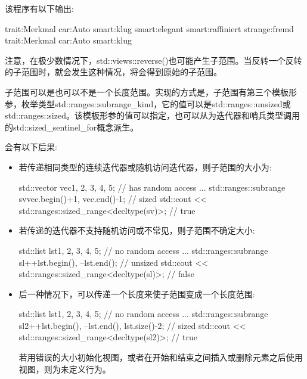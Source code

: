 该程序有以下输出:

\begin{shell}
trait:Merkmal car:Auto smart:klug smart:elegant smart:raffiniert strange:fremd
trait:Merkmal car:Auto smart:klug
\end{shell}

注意，在极少数情况下，std::views::reverse()也可能产生子范围。当反转一个反转的子范围时，就会发生这种情况，将会得到原始的子范围。



子范围可以是也可以不是一个长度范围。实现的方式是，子范围有第三个模板形参，枚举类型std::ranges::subrange\_kind，它的值可以是std::ranges::unsized或std::ranges::sized。该模板形参的值可以指定，也可以从为迭代器和哨兵类型调用的std::sized\_sentinel\_for概念派生。

会有以下后果:

\begin{itemize}
\item
若传递相同类型的连续迭代器或随机访问迭代器，则子范围的大小为:

\begin{cpp}
std::vector vec{1, 2, 3, 4, 5}; // has random access
...
std::ranges::subrange sv{vec.begin()+1, vec.end()-1}; // sized
std::cout << std::ranges::sized_range<decltype(sv)>; // true
\end{cpp}

\item
若传递的迭代器不支持随机访问或不常见，则子范围不确定大小:

\begin{cpp}
std::list lst{1, 2, 3, 4, 5}; // no random access
...
std::ranges::subrange sl{++lst.begin(), --lst.end()}; // unsized
std::cout << std::ranges::sized_range<decltype(sl)>; // false
\end{cpp}

\item
后一种情况下，可以传递一个长度来使子范围变成一个长度范围:

\begin{cpp}
std::list lst{1, 2, 3, 4, 5}; // no random access
...
std::ranges::subrange sl2{++lst.begin(), --lst.end(), lst.size()-2}; // sized
std::cout << std::ranges::sized_range<decltype(sl2)>; // true
\end{cpp}

若用错误的大小初始化视图，或者在开始和结束之间插入或删除元素之后使用视图，则为未定义行为。
\end{itemize}


